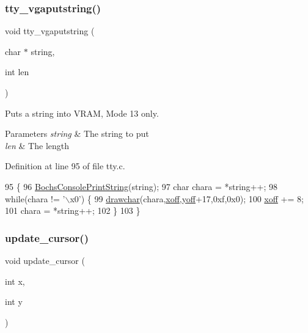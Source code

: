 \subsubsection{\texorpdfstring{tty\+\_\+vgaputstring()}{tty\_vgaputstring()}}
{\footnotesize\ttfamily void tty\+\_\+vgaputstring (\begin{DoxyParamCaption}\item[{char $\ast$}]{string,  }\item[{int}]{len }\end{DoxyParamCaption})}



Puts a string into V\+R\+AM, Mode 13 only. 


\begin{DoxyParams}{Parameters}
{\em string} & The string to put \\
\hline
{\em len} & The length \\
\hline
\end{DoxyParams}


Definition at line 95 of file tty.\+c.


\begin{DoxyCode}
95                                              \{
96     \hyperlink{a00077_a19e1f554d03c977f8b947f21489daa41_a19e1f554d03c977f8b947f21489daa41}{BochsConsolePrintString}(\textcolor{keywordtype}{string});
97     \textcolor{keywordtype}{char} chara = *\textcolor{keywordtype}{string}++;
98     \textcolor{keywordflow}{while}(chara != \textcolor{stringliteral}{'\(\backslash\)x0'}) \{
99         \hyperlink{a00062_a2c8df7a20b47341b70d97a7ff21d86ea_a2c8df7a20b47341b70d97a7ff21d86ea}{drawchar}(chara,\hyperlink{a00173_abaa0d20f0e52ce0d3a7d706f6ac16266_abaa0d20f0e52ce0d3a7d706f6ac16266}{xoff},\hyperlink{a00173_a1a7539764d0ae8cd06ce45c62cf92bca_a1a7539764d0ae8cd06ce45c62cf92bca}{yoff}+17,0xf,0x0);
100         \hyperlink{a00173_abaa0d20f0e52ce0d3a7d706f6ac16266_abaa0d20f0e52ce0d3a7d706f6ac16266}{xoff} += 8;
101         chara = *\textcolor{keywordtype}{string}++;
102     \}
103 \}
\end{DoxyCode}
\mbox{\label{a00176_a492f5021d7340613e732ef37bbaa04e4_a492f5021d7340613e732ef37bbaa04e4}} 
\subsubsection{\texorpdfstring{update\+\_\+cursor()}{update\_cursor()}}
{\footnotesize\ttfamily void update\+\_\+cursor (\begin{DoxyParamCaption}\item[{int}]{x,  }\item[{int}]{y }\end{DoxyParamCaption})}



